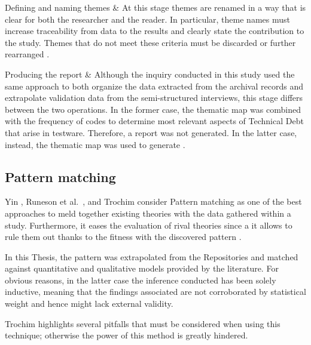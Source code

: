 \begin{table}[!htbp]
\begin{tabu}
    Defining and naming themes &
    At this stage themes are renamed in a way that is clear for both the researcher and the reader. In particular, theme names must increase traceability from data to the results and clearly state the contribution to the study. Themes that do not meet these criteria must be discarded or further rearranged \cite{thematic_analysis}.\\
    \hline
    
    Producing the report &
    Although the inquiry conducted in this study used the same approach to both organize the data extracted from the archival records and extrapolate validation data from the semi-structured interviews, this stage differs between the two operations. In the former case, the thematic map was combined with the frequency of codes to determine most relevant aspects of Technical Debt that arise in testware. Therefore, a report was not generated. In the latter case, instead, the thematic map was used to generate .\\
    \hline
    
\end{tabu}
\caption{Description of steps taken while performing thematic analysis}
\label{tab:thematic_analysis_steps}
\end{table}


\subsection{Pattern matching}
Yin \cite{case_study_guide}, Runeson et al.\ \cite{case_study_software_engineering}, and Trochim \cite{pattern_matching} consider Pattern matching as one of the best approaches to meld together existing theories with the data gathered within a study. Furthermore, it eases the evaluation of rival theories since a it allows to rule them out thanks to the fitness with the discovered pattern \cite{pattern_matching}.

In this Thesis, the pattern was extrapolated from the Repositories and matched against quantitative and qualitative models provided by the literature. For obvious reasons, in the latter case the inference conducted has been solely inductive, meaning that the findings associated are not corroborated by statistical weight and hence might lack external validity.


Trochim \cite{pattern_matching} highlights several pitfalls that must be considered when using this technique; otherwise the power of this method is greatly hindered. 

